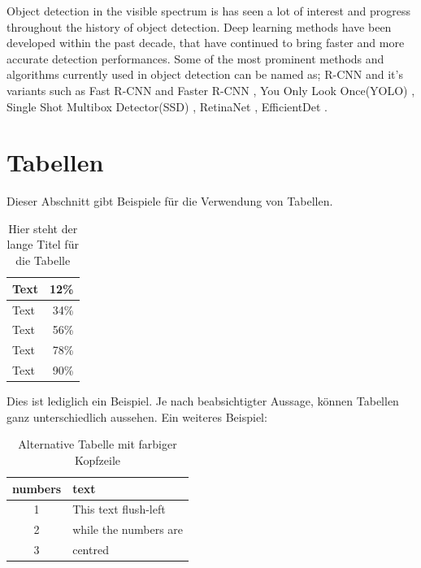 Object detection in the visible spectrum is has seen a lot of interest and progress throughout the history of object detection. Deep learning methods have been developed within the past decade, that have continued to bring faster and more accurate detection performances. Some of the most prominent methods and algorithms currently used in object detection can be named as; R-CNN \citep{girshick2014rcnn} and it's variants such as Fast R-CNN \citep{girshick2015fast} and Faster R-CNN \citep{ren2015faster}, You Only Look Once(YOLO) \citep{redmon2016look}, Single Shot Multibox Detector(SSD) \citep{Liu_2016ssd}, RetinaNet \citep{lin2018focal}, EfficientDet \citep{tan2020efficientdet}.


\section{Tabellen}
\label{sec:Tabellen}
Dieser Abschnitt gibt Beispiele für die Verwendung von Tabellen.

\begin{table}[ht]
    \vspace{0.5em}
	\centering
	\begin{tabular}{|l|r|}
        \hline
        Text & 12\% \\
        \hline
        Text & 34\% \\
        \hline
        Text & 56\% \\
        \hline
        Text & 78\% \\
        \hline
        Text & 90\% \\
        \hline
	\end{tabular}
	\caption[Kurztitel Tabelle]{Hier steht der lange Titel für die Tabelle}
	\label{tab:tabelle}
	\vspace{0.5em}
\end{table}

\noindent{}Dies ist lediglich ein Beispiel. Je nach beabsichtigter Aussage, können Tabellen ganz unterschiedlich aussehen. Ein weiteres Beispiel:

\begin{table}[ht]
    \vspace{0.5em}
	\centering
	\begin{tabular}{|c|l|}
		\hline
		\rowcolor[gray]{0.9}\textbf{numbers} & \textbf{text} \\
		\hline
		\hline
		1 & This text flush-left \\
		\hline
		2 & while the numbers are \\
		\hline
		3 & centred \\
		\hline
	\end{tabular}
	\caption[Alternative Tabelle]{Alternative Tabelle mit farbiger Kopfzeile}
	\label{tab:tablealternative}
	\vspace{0.5em}
\end{table}


